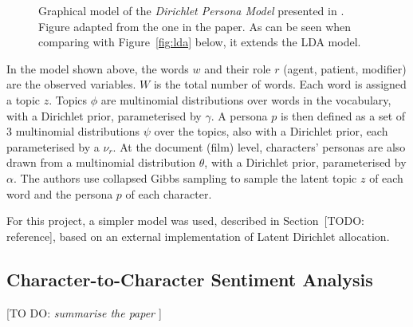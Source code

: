 \documentclass[bsc,frontabs,singlespacing,parskip]{infthesis} %
\begin{document}
\begin{figure}[ht!]
\centering
{}
\caption{Graphical model of the \textit{Dirichlet Persona Model} presented in \cite{Bamman2014}. Figure adapted from the one in the paper. As can be seen when comparing with Figure~\ref{fig:lda} below, it extends the LDA model.}
\end{figure}

In the model shown above, the words $w$ and their role $r$ (agent, patient, modifier) are the observed variables. $W$ is the total number of words. Each word is assigned a topic $z$. Topics $\phi$ are multinomial distributions over words in the vocabulary, with a Dirichlet prior, parameterised by $\gamma$. A persona $p$ is then defined as a set of 3 multinomial distributions $\psi$ over the topics, also with a Dirichlet prior, each parameterised by a $\nu_r$. At the document (film) level, characters' personas are also drawn from a multinomial distribution $\theta$, with a Dirichlet prior, parameterised by $\alpha$. The authors use collapsed Gibbs sampling \cite{griffiths2004finding} to sample the latent topic $z$ of each word and the persona $p$ of each character. 

For this project, a simpler model was used, described in Section~[TODO: reference], based on an external implementation of Latent Dirichlet allocation.




\subsection{Character-to-Character Sentiment Analysis}
[TO DO: \textit{summarise the paper \cite{Nalisnick2013}}]
\end{document}
